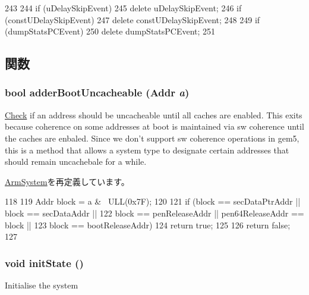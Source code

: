 \begin{DoxyCode}
243 {
244     if (uDelaySkipEvent)
245         delete uDelaySkipEvent;
246     if (constUDelaySkipEvent)
247         delete constUDelaySkipEvent;
248 
249     if (dumpStatsPCEvent)
250         delete dumpStatsPCEvent;
251 }
\end{DoxyCode}


\subsection{関数}
\hypertarget{classLinuxArmSystem_ac081da131af9bc2b37f4c4d7d99eaff1}{
\subsubsection[{adderBootUncacheable}]{\setlength{\rightskip}{0pt plus 5cm}bool adderBootUncacheable ({\bf Addr} {\em a})}}
\label{classLinuxArmSystem_ac081da131af9bc2b37f4c4d7d99eaff1}
\hyperlink{classCheck}{Check} if an address should be uncacheable until all caches are enabled. This exits because coherence on some addresses at boot is maintained via sw coherence until the caches are enbaled. Since we don't support sw coherence operations in gem5, this is a method that allows a system type to designate certain addresses that should remain uncachebale for a while. 

\hyperlink{classArmSystem_aa3d376f8ebebf8bc40b44b3ef359cf3d}{ArmSystem}を再定義しています。


\begin{DoxyCode}
118 {
119     Addr block = a & ~ULL(0x7F);
120 
121     if (block == secDataPtrAddr || block == secDataAddr ||
122             block == penReleaseAddr || pen64ReleaseAddr == block ||
123             block == bootReleaseAddr)
124         return true;
125 
126     return false;
127 }
\end{DoxyCode}
\hypertarget{classLinuxArmSystem_a3c34ea9b29f410748d4435a667484924}{
\subsubsection[{initState}]{\setlength{\rightskip}{0pt plus 5cm}void initState ()}}
\label{classLinuxArmSystem_a3c34ea9b29f410748d4435a667484924}
Initialise the system 

